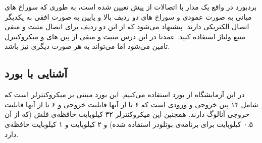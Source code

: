 بردبورد در واقع یک مدار با اتصالات از پیش تعیین شده است، به طوری که سوراخ های میانی به صورت عمودی و سوراخ های دو ردیف بالا و پایین به صورت افقی به یکدیگر اتصال الکتریکی دارند. پیشنهاد می‌شود که از این دو ردیف برای اتصال مثبت و منفی منبع ولتاژ استفاده کنید. عمدتا در این درس مثبت و منفی از پین های  و  میکروکنترل تامین می‌شود اما می‌تواند به هر صورت دیگری نیز باشد. 

\subsection{آشنایی با بورد }

در این آزمایشگاه از بورد  استفاده می‌کنیم. این بورد مبتنی بر میکروکنترلر  است که شامل ۱۴ پین خروجی و ورودی است که ۶ تا از آنها قابلیت خروجی  و ۶ تا از آنها قابلیت خروجی آنالوگ دارند. همچنین این میکروکنترلر ۳۲ کیلوبایت حافظه‌ی فلش (که از آن ۰.۵ کیلوبایت برای برنامه‌ی بوتلودر استفاده شده) و ۲ کیلوبایت  و ۱ کیلوبایت حافظه‌ی  دارد.
